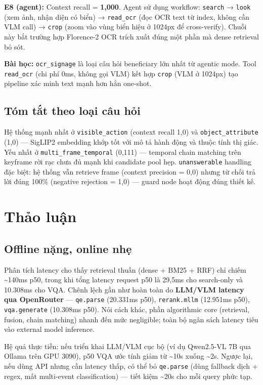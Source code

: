 \documentclass[12pt,a4paper,onecolumn]{article}
\begin{document}
\textbf{E8 (agent):} Context recall = \textbf{1,000}. Agent sử dụng workflow: \texttt{search} → \texttt{look} (xem ảnh, nhận diện có biển) → \texttt{read\_ocr} (đọc OCR text từ index, không cần VLM call) → \texttt{crop} (zoom vào vùng biển hiệu ở 1024px để cross-verify). Chuỗi này bắt trường hợp Florence-2 OCR trích xuất đúng một phần mà dense retrieval bỏ sót.

\textbf{Bài học:} \texttt{ocr\_signage} là loại câu hỏi beneficiary lớn nhất từ agentic mode. Tool \texttt{read\_ocr} (chi phí 0ms, không gọi VLM) kết hợp \texttt{crop} (VLM ở 1024px) tạo pipeline xác minh text mạnh hơn hẳn one-shot.

\subsection{Tóm tắt theo loại câu hỏi}

Hệ thống mạnh nhất ở \texttt{visible\_action} (context recall 1,0) và \texttt{object\_attribute} (1,0) — SigLIP2 embedding khớp tốt với mô tả hành động và thuộc tính thị giác. Yếu nhất ở \texttt{multi\_frame\_temporal} (0,111) — temporal chain matching trên keyframe rời rạc chưa đủ mạnh khi candidate pool hẹp. \texttt{unanswerable} handling đặc biệt: hệ thống vẫn retrieve frame (context precision = 0,0) nhưng từ chối trả lời đúng 100\% (negative rejection = 1,0) — guard node hoạt động đúng thiết kế.

\section{Thảo luận}

\subsection{Offline nặng, online nhẹ}

Phân tích latency cho thấy retrieval thuần (dense + BM25 + RRF) chỉ chiếm \textasciitilde{}140ms p50, trong khi tổng latency request p50 là 29,5ms cho search-only và 10.308ms cho VQA. Chênh lệch gần như hoàn toàn do \textbf{LLM/VLM latency qua OpenRouter} — \texttt{qe.parse} (20.331ms p50), \texttt{rerank.mllm} (12.951ms p50), \texttt{vqa.generate} (10.308ms p50). Nói cách khác, phần algorithmic core (retrieval, fusion, chain matching) nhanh đến mức negligible; toàn bộ ngân sách latency tiêu vào external model inference.

Hệ quả thực tiễn: nếu triển khai LLM/VLM cục bộ (ví dụ Qwen2.5-VL 7B qua Ollama trên GPU 3090), p50 VQA ước tính giảm từ \textasciitilde{}10s xuống \textasciitilde{}2s. Ngược lại, nếu dùng API nhưng cần latency thấp, có thể bỏ \texttt{qe.parse} (dùng fallback dịch + regex, mất multi-event classification) — tiết kiệm \textasciitilde{}20s cho mỗi query phức tạp.
\end{document}
